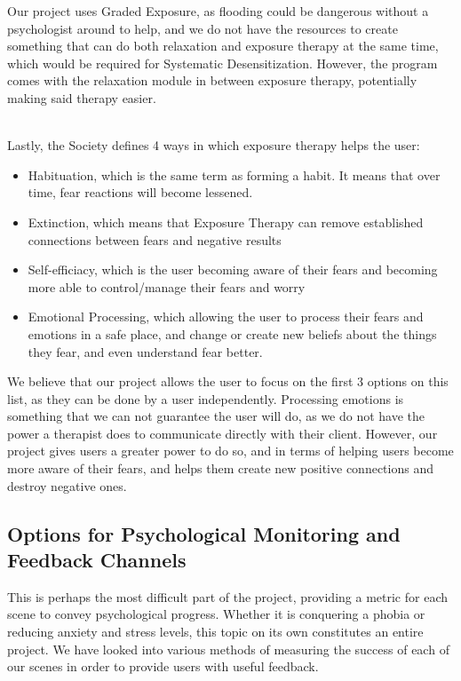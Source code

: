 \documentclass[a4paper,10pt]{article}
\begin{document}
Our project uses Graded Exposure, as flooding could be dangerous without a psychologist around to help, and we do not have the resources to create something that can do
both relaxation and exposure therapy at the same time, which would be required for Systematic Desensitization. However, the program comes with the relaxation
module in between exposure therapy, potentially making said therapy easier.
\par~\\ 
Lastly, the Society defines 4 ways in which exposure therapy helps the user:
\begin{itemize}
	\item Habituation, which is the same term as forming a habit.  It means that over time, fear reactions will become lessened.
	\item Extinction, which means that Exposure Therapy can remove established connections between fears and negative results
	\item Self-efficiacy, which is the user becoming aware of their fears and becoming more able to control/manage their fears and worry
	\item Emotional Processing, which allowing the user to process their fears and emotions in a safe place, and change or create new beliefs about the things they fear, 
	and even understand fear better.
\end{itemize}

We believe that our project allows the user to focus on the first 3 options on this list, as they can be done by a user independently.  Processing emotions is something that we can not guarantee 
the user will do, as we do not have the power a therapist does to communicate directly with their client.  However, our project gives users a greater power to do so, and in terms 
of helping users become more aware of their fears, and helps them create new positive connections and destroy negative ones. \cite{exposeTherapy}


\pagebreak

\pagebreak
\subsection{Options for Psychological Monitoring and Feedback Channels}
This is perhaps the most difficult part of the project, providing a metric for each scene to convey psychological progress. Whether it is conquering a phobia or
reducing anxiety and stress levels, this topic on its own constitutes an entire project. We have looked into various methods of measuring the success of each of our
scenes in order to provide users with useful feedback.
\end{document}
